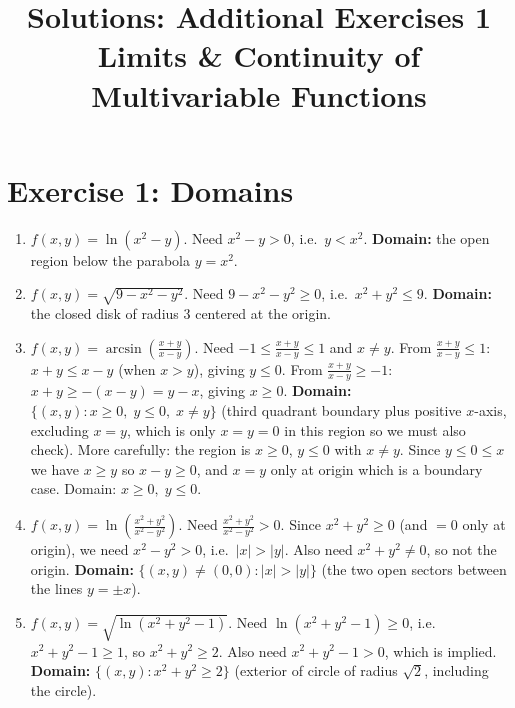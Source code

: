 \documentclass[12pt,a4paper]{article}
\title{\textbf{Solutions: Additional Exercises 1}\\
\large Limits \& Continuity of Multivariable Functions}
\date{}
\begin{document}
\maketitle
\thispagestyle{empty}

\section*{Exercise 1: Domains}

\begin{enumerate}[leftmargin=*, label=(\alph*)]

\item $f(x,y)=\ln(x^2-y)$. Need $x^2-y>0$, i.e.\ $y<x^2$.
\textbf{Domain:} the open region below the parabola $y=x^2$.

\item $f(x,y)=\sqrt{9-x^2-y^2}$. Need $9-x^2-y^2\ge 0$, i.e.\ $x^2+y^2\le 9$.
\textbf{Domain:} the closed disk of radius $3$ centered at the origin.

\item $f(x,y)=\arcsin\!\left(\frac{x+y}{x-y}\right)$. Need $-1\le\frac{x+y}{x-y}\le 1$ and $x\ne y$.
From $\frac{x+y}{x-y}\le 1$: $x+y\le x-y$ (when $x>y$), giving $y\le 0$.
From $\frac{x+y}{x-y}\ge -1$: $x+y\ge -(x-y)=y-x$, giving $x\ge 0$.
\textbf{Domain:} $\{(x,y): x\ge 0,\; y\le 0,\; x\ne y\}$ (third quadrant boundary plus positive $x$-axis, excluding $x=y$, which is only $x=y=0$ in this region so we must also check).
More carefully: the region is $x\ge 0$, $y\le 0$ with $x\ne y$. Since $y\le 0\le x$ we have $x\ge y$ so $x-y\ge 0$, and $x=y$ only at origin which is a boundary case. Domain: $x\ge 0,\;y\le 0$.

\item $f(x,y)=\ln\!\left(\frac{x^2+y^2}{x^2-y^2}\right)$. Need $\frac{x^2+y^2}{x^2-y^2}>0$.
Since $x^2+y^2\ge 0$ (and $=0$ only at origin), we need $x^2-y^2>0$, i.e.\ $|x|>|y|$.
Also need $x^2+y^2\ne 0$, so not the origin.
\textbf{Domain:} $\{(x,y)\ne(0,0): |x|>|y|\}$ (the two open sectors between the lines $y=\pm x$).

\item $f(x,y)=\sqrt{\ln(x^2+y^2-1)}$. Need $\ln(x^2+y^2-1)\ge 0$, i.e.\ $x^2+y^2-1\ge 1$,
so $x^2+y^2\ge 2$. Also need $x^2+y^2-1>0$, which is implied.
\textbf{Domain:} $\{(x,y): x^2+y^2\ge 2\}$ (exterior of circle of radius $\sqrt{2}$, including the circle).

\end{enumerate}
\end{document}
